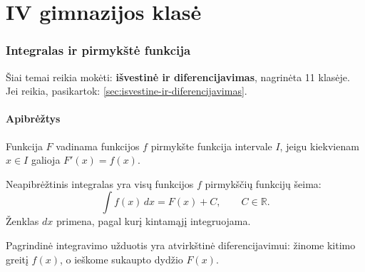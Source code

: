\part{IV gimnazijos klasė}

\section{Integralas ir pirmykštė funkcija}\label{sec:integralas-ir-pirmykste-funkcija}

\begin{tcolorbox}[title=Primename iš ankstesnių klasių, colback=yellow!10]
Šiai temai reikia mokėti: \textbf{išvestinė ir diferencijavimas}, nagrinėta 11 klasėje.
Jei reikia, pasikartok: \ref{sec:isvestine-ir-diferencijavimas}.
\end{tcolorbox}

\subsection{Apibrėžtys}
\begin{apibreztis}
Funkcija \(F\) vadinama funkcijos \(f\) pirmykšte funkcija intervale \(I\), jeigu kiekvienam \(x\in I\) galioja \(F'(x)=f(x)\).
\end{apibreztis}
\begin{apibreztis}
Neapibrėžtinis integralas yra visų funkcijos \(f\) pirmykščių funkcijų šeima:
\[
\int f(x)\,dx=F(x)+C,\qquad C\in\mathbb{R}.
\]
Ženklas \(dx\) primena, pagal kurį kintamąjį integruojama.
\end{apibreztis}
\begin{apibreztis}
Pagrindinė integravimo užduotis yra atvirkštinė diferencijavimui: žinome kitimo greitį \(f(x)\), o ieškome sukaupto dydžio \(F(x)\).
\end{apibreztis}

